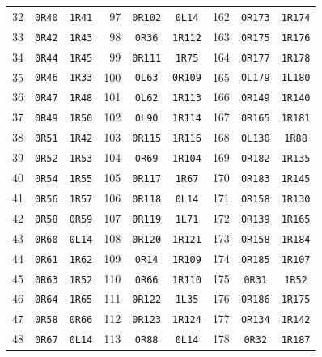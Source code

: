 \documentclass[10pt,a4paper]{article}
\begin{document}
\begin{center}
\begin{tabular}{rcc@{\hspace{14pt}}rcc@{\hspace{14pt}}rcc}
32 & \texttt{0R40} & \texttt{1R41} & 97 & \texttt{0R102} & \texttt{0L14} & 162 & \texttt{0R173} & \texttt{1R174} \\
33 & \texttt{0R42} & \texttt{1R43} & 98 & \texttt{0R36} & \texttt{1R112} & 163 & \texttt{0R175} & \texttt{1R176} \\
34 & \texttt{0R44} & \texttt{1R45} & 99 & \texttt{0R111} & \texttt{1R75} & 164 & \texttt{0R177} & \texttt{1R178} \\
35 & \texttt{0R46} & \texttt{1R33} & 100 & \texttt{0L63} & \texttt{0R109} & 165 & \texttt{0L179} & \texttt{1L180} \\
36 & \texttt{0R47} & \texttt{1R48} & 101 & \texttt{0L62} & \texttt{1R113} & 166 & \texttt{0R149} & \texttt{1R140} \\
37 & \texttt{0R49} & \texttt{1R50} & 102 & \texttt{0L90} & \texttt{1R114} & 167 & \texttt{0R165} & \texttt{1R181} \\
38 & \texttt{0R51} & \texttt{1R42} & 103 & \texttt{0R115} & \texttt{1R116} & 168 & \texttt{0L130} & \texttt{1R88} \\
39 & \texttt{0R52} & \texttt{1R53} & 104 & \texttt{0R69} & \texttt{1R104} & 169 & \texttt{0R182} & \texttt{1R135} \\
40 & \texttt{0R54} & \texttt{1R55} & 105 & \texttt{0R117} & \texttt{1R67} & 170 & \texttt{0R183} & \texttt{1R145} \\
41 & \texttt{0R56} & \texttt{1R57} & 106 & \texttt{0R118} & \texttt{0L14} & 171 & \texttt{0R158} & \texttt{1R130} \\
42 & \texttt{0R58} & \texttt{0R59} & 107 & \texttt{0R119} & \texttt{1L71} & 172 & \texttt{0R139} & \texttt{1R165} \\
43 & \texttt{0R60} & \texttt{0L14} & 108 & \texttt{0R120} & \texttt{1R121} & 173 & \texttt{0R158} & \texttt{1R184} \\
44 & \texttt{0R61} & \texttt{1R62} & 109 & \texttt{0R14} & \texttt{1R109} & 174 & \texttt{0R185} & \texttt{1R107} \\
45 & \texttt{0R63} & \texttt{1R52} & 110 & \texttt{0R66} & \texttt{1R110} & 175 & \texttt{0R31} & \texttt{1R52} \\
46 & \texttt{0R64} & \texttt{1R65} & 111 & \texttt{0R122} & \texttt{1L35} & 176 & \texttt{0R186} & \texttt{1R175} \\
47 & \texttt{0R58} & \texttt{0R66} & 112 & \texttt{0R123} & \texttt{1R124} & 177 & \texttt{0R134} & \texttt{1R142} \\
48 & \texttt{0R67} & \texttt{0L14} & 113 & \texttt{0R88} & \texttt{0L14} & 178 & \texttt{0R32} & \texttt{1R187} \\

\end{tabular}
\end{center}
\end{document}
